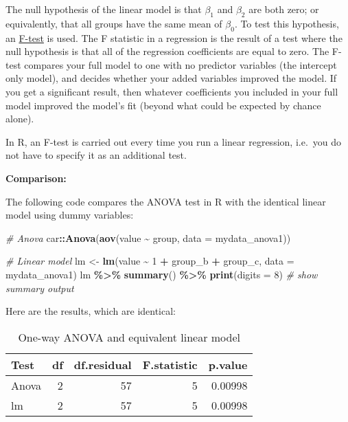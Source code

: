 \documentclass[
  12pt,
]{krantz}
\newenvironment{Shaded}{\begin{snugshade}}{\end{snugshade}}
\newcommand{\CommentTok}[1]{\textcolor[rgb]{0.56,0.35,0.01}{\textit{#1}}}
\newcommand{\DataTypeTok}[1]{\textcolor[rgb]{0.13,0.29,0.53}{#1}}
\newcommand{\DecValTok}[1]{\textcolor[rgb]{0.00,0.00,0.81}{#1}}
\newcommand{\KeywordTok}[1]{\textcolor[rgb]{0.13,0.29,0.53}{\textbf{#1}}}
\newcommand{\NormalTok}[1]{#1}
\newcommand{\OperatorTok}[1]{\textcolor[rgb]{0.81,0.36,0.00}{\textbf{#1}}}
\newcommand{\StringTok}[1]{\textcolor[rgb]{0.31,0.60,0.02}{#1}}
\begin{document}
The null hypothesis of the linear model is that \(\beta_1\) and \(\beta_2\) are both zero; or equivalently, that all groups have the same mean of \(\beta_0\). To test this hypothesis, an \href{https://www.statisticshowto.datasciencecentral.com/probability-and-statistics/f-statistic-value-test/}{F-test} is used. The F statistic in a regression is the result of a test where the null hypothesis is that all of the regression coefficients are equal to zero. The F-test compares your full model to one with no predictor variables (the intercept only model), and decides whether your added variables improved the model. If you get a significant result, then whatever coefficients you included in your full model improved the model's fit (beyond what could be expected by chance alone).

In R, an F-test is carried out every time you run a linear regression, i.e.~you do not have to specify it as an additional test.

\textbf{Comparison:}

The following code compares the ANOVA test in R with the identical linear model using dummy variables:

\begin{Shaded}
\begin{Highlighting}[]
\CommentTok{\# Anova}
\NormalTok{car}\OperatorTok{::}\KeywordTok{Anova}\NormalTok{(}\KeywordTok{aov}\NormalTok{(value }\OperatorTok{\textasciitilde{}}\StringTok{ }\NormalTok{group, }\DataTypeTok{data =}\NormalTok{ mydata\_anova1))}

\CommentTok{\# Linear model}
\NormalTok{lm \textless{}{-}}\StringTok{ }\KeywordTok{lm}\NormalTok{(value }\OperatorTok{\textasciitilde{}}\StringTok{ }\DecValTok{1} \OperatorTok{+}\StringTok{ }\NormalTok{group\_b }\OperatorTok{+}\StringTok{ }\NormalTok{group\_c, }\DataTypeTok{data =}\NormalTok{ mydata\_anova1)}
\NormalTok{  lm }\OperatorTok{\%\textgreater{}\%}\StringTok{ }\KeywordTok{summary}\NormalTok{() }\OperatorTok{\%\textgreater{}\%}\StringTok{ }\KeywordTok{print}\NormalTok{(}\DataTypeTok{digits =} \DecValTok{8}\NormalTok{) }\CommentTok{\# show summary output}
\end{Highlighting}
\end{Shaded}

Here are the results, which are identical:

\begin{table}

\caption{\label{tab:unnamed-chunk-40}One-way ANOVA and equivalent linear model}
\centering
\begin{tabular}[t]{lrrrr}
\toprule
Test & df & df.residual & F.statistic & p.value\\
\midrule
Anova & 2 & 57 & 5 & 0.00998\\
lm & 2 & 57 & 5 & 0.00998\\
\bottomrule
\end{tabular}
\end{table}
\end{document}
